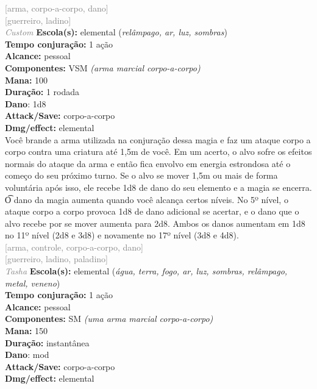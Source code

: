 \documentclass{RPG_Adventure}[2021/10/20]
\begin{document}
{\scriptsize \textcolor{gray}{[arma, corpo-a-corpo, dano]\\}}
{\scriptsize \textcolor{gray}{[guerreiro, ladino]\\}}
{\tiny \textcolor{gray}{\textit{Custom}}}
{\small \t \textbf{Escola(s):} elemental (\textit{relâmpago, ar, luz, sombras})\\\t \textbf{Tempo conjuração:} 1 ação\\\t \textbf{Alcance:} pessoal\\\t \textbf{Componentes:} VSM \textit{(arma marcial corpo-a-corpo)}\\\t \textbf{Mana:} 100\\\t \textbf{Duração:} 1 rodada\\\t \textbf{Dano}: 1d8\\\t \textbf{Attack/Save:} corpo-a-corpo\\\t \textbf{Dmg/effect:} elemental\\}
{\normalsize Você brande a arma utilizada na conjuração dessa magia e faz um ataque corpo a corpo contra uma criatura até 1,5m de você. Em um acerto, o alvo sofre os efeitos normais do ataque da arma e então fica envolvo em energia estrondosa até o começo do seu próximo turno. Se o alvo se mover 1,5m ou mais de forma voluntária após isso, ele recebe 1d8 de dano do seu elemento e a magia se encerra.\\\t O dano da magia aumenta quando você alcança certos níveis. No 5º nível, o ataque corpo a corpo provoca 1d8 de dano adicional se acertar, e o dano que o alvo recebe por se mover aumenta para 2d8. Ambos os danos aumentam em 1d8 no 11º nível (2d8 e 3d8) e novamente no 17º nível (3d8 e 4d8).\\}
{\scriptsize \textcolor{gray}{[arma, controle, corpo-a-corpo, dano]\\}}
{\scriptsize \textcolor{gray}{[guerreiro, ladino, paladino]\\}}
{\tiny \textcolor{gray}{\textit{Tasha}}}
{\small \t \textbf{Escola(s):} elemental (\textit{água, terra, fogo, ar, luz, sombras, relâmpago, metal, veneno})\\\t \textbf{Tempo conjuração:} 1 ação\\\t \textbf{Alcance:} pessoal\\\t \textbf{Componentes:} SM \textit{(uma arma marcial corpo-a-corpo)}\\\t \textbf{Mana:} 150\\\t \textbf{Duração:} instantânea\\\t \textbf{Dano}: mod\\\t \textbf{Attack/Save:} corpo-a-corpo\\\t \textbf{Dmg/effect:} elemental\\}
\end{document}
